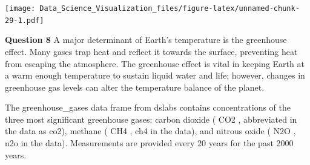 \documentclass[
]{article}
\newenvironment{Shaded}{\begin{snugshade}}{\end{snugshade}}
\newcommand{\DataTypeTok}[1]{\textcolor[rgb]{0.13,0.29,0.53}{#1}}
\newcommand{\DecValTok}[1]{\textcolor[rgb]{0.00,0.00,0.81}{#1}}
\newcommand{\FloatTok}[1]{\textcolor[rgb]{0.00,0.00,0.81}{#1}}
\newcommand{\KeywordTok}[1]{\textcolor[rgb]{0.13,0.29,0.53}{\textbf{#1}}}
\newcommand{\NormalTok}[1]{#1}
\newcommand{\OperatorTok}[1]{\textcolor[rgb]{0.81,0.36,0.00}{\textbf{#1}}}
\newcommand{\StringTok}[1]{\textcolor[rgb]{0.31,0.60,0.02}{#1}}
\begin{document}
\begin{Shaded}
\end{Shaded}

\texttt{[image: Data\_Science\_Visualization\_files/figure-latex/unnamed-chunk-29-1.pdf]}

\textbf{Question 8} A major determinant of Earth's temperature is the
greenhouse effect. Many gases trap heat and reflect it towards the
surface, preventing heat from escaping the atmosphere. The greenhouse
effect is vital in keeping Earth at a warm enough temperature to sustain
liquid water and life; however, changes in greenhouse gas levels can
alter the temperature balance of the planet.

The greenhouse\_gases data frame from dslabs contains concentrations of
the three most significant greenhouse gases: carbon dioxide ( CO2 ,
abbreviated in the data as co2), methane ( CH4 , ch4 in the data), and
nitrous oxide ( N2O , n2o in the data). Measurements are provided every
20 years for the past 2000 years.
\end{document}
